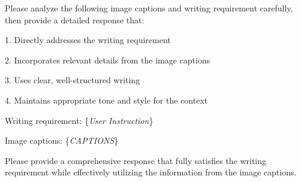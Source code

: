 
\begin{tcolorbox}[size=title,opacityfill=0.05,breakable]
\noindent
Please analyze the following image captions and writing requirement carefully, then provide a detailed response that:

        1. Directly addresses the writing requirement
        
        2. Incorporates relevant details from the image captions
        
        3. Uses clear, well-structured writing
        
        4. Maintains appropriate tone and style for the context

Writing requirement: \{\textit{User Instruction}\}


Image captions: \{\textit{CAPTIONS}\}


Please provide a comprehensive response that fully satisfies the writing requirement while effectively utilizing the information from the image captions.
\end{tcolorbox}


